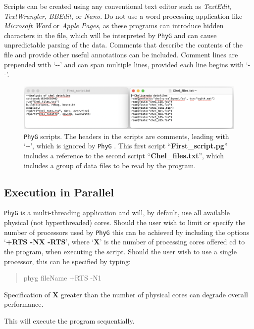 \documentclass[11pt]{book}
\newcommand{\phyg}{\texttt{PhyG} }
\begin{document}
{{		Scripts can be created using any conventional text editor such as \textit{TextEdit}, 
		\textit{TextWrangler}, \textit{BBEdit}, or \textit{Nano}. Do not use a word processing 
		application like \textit{Microsoft Word} or \textit{Apple Pages}, as these programs 
		can introduce hidden characters in the file, which will be interpreted by \phyg and 
		can cause unpredictable parsing of the data. Comments that describe the contents 
		of the file and provide other useful annotations can be included. Comment lines are 
		prepended with `-{}-' and can span multiple lines, provided each line begins with `-{}-'. 

		\begin{figure}[H]
		\centering
		\includegraphics[width=\textwidth]{First_run.jpg}
		\caption{\phyg scripts. The headers in the scripts are comments, leading with `-{}-', 
		which is ignored by \phyg. This first script ``\textbf{First\_script.pg}'' includes a reference 
		to the second script ``\textbf{Chel\_files.txt}'', which includes a group of data files to be 
		read by the program.}
		\label{firstscript}
		\end{figure}
	
	\subsection{Execution in Parallel}
	\label{subsec:parallel}
		\phyg is a multi-threading application and will, by default,  use all available physical (not hyperthreaded) cores. Should 
		the user wish to limit or specify the number of processors used by \phyg this can be achieved 
		by including the options `\textbf{+RTS -NX -RTS}', where `\textbf{X}' is the number of processing cores 
		offered cd to the program, when executing the script. Should the user wish to use a single processor, 
		this can be specified by typing:

		\begin{quote}
		phyg fileName +RTS -N1 
		\end{quote}
		
		Specification of \textbf{X} greater than the number of physical cores can degrade overall performance.
		
		\medskip
		\noindent This will execute the program sequentially.		

}}
\end{document}
